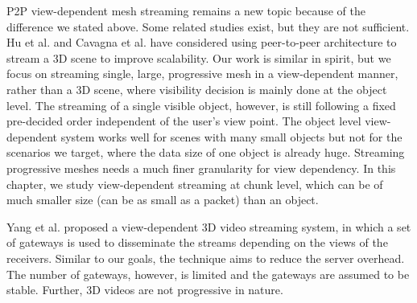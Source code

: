     P2P view-dependent mesh streaming remains a new topic because
    of the difference we stated above. 
    Some related studies exist, but they are not sufficient.
    Hu et al. \cite{Hu2008} and Cavagna et al. \cite{Cavagna2006} have considered using peer-to-peer architecture to stream a 3D scene
    to improve scalability.  Our work is similar in
    spirit, but we focus on streaming single, large,
    progressive mesh in a view-dependent manner, rather than a 3D scene,
    where visibility decision is mainly done at the object level.
    The streaming
    of a single visible object, however, is still following a fixed
    pre-decided order independent of the user's view point. 
    The object level view-dependent system works well
    for scenes with many small objects but not for the
    scenarios we target,
    where %
    the data size of one object is already huge.  
    Streaming %
    progressive meshes needs 
    a much finer granularity for view dependency. 
    In this chapter, we study view-dependent streaming at 
    chunk level, which can be of much smaller size (can be as small as a packet) than an object.

Yang et al. \cite{viewcast:yang} proposed a view-dependent 
3D video streaming system, in which a set of gateways is used 
to disseminate the streams depending on the views of the receivers.
Similar to our goals, the technique aims to reduce the server 
overhead.  The number of gateways, however, is limited and the
gateways are assumed to be stable.  Further, 3D videos are not
progressive in nature. 


